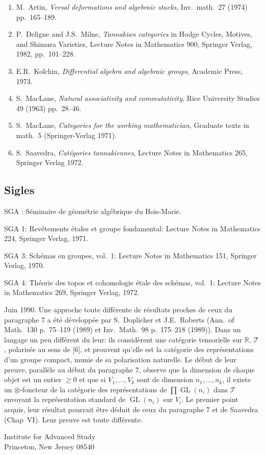 \documentclass[12pt,a4paper]{article}
\theoremstyle{plain}
\theoremstyle{definition}
\DeclareMathOperator{\GL}{GL}
\begin{document}
\begin{enumerate}
\item[{[1]}] M.~Artin, \textit{Versal deformations and algebraic stacks}, Inv.~math.~27 (1974) pp.~165--189.

\item[{[2]}] P.~Deligne and J.S.~Milne, \textit{Tannakian categories} in Hodge Cycles, Motives, and Shimura Varieties, Lecture Notes in Mathematics 900, Springer Verlag, 1982, pp.~101--228.

\item[{[3]}] E.R.~Kolchin, \textit{Differential algebra and algebraic groups}, Academic Press, 1973.

\item[{[4]}] S.~MacLane, \textit{Natural associativity and commutativity}, Rice University Studies 49 (1963) pp.~28--46.

\item[{[5]}] S.~MacLane, \textit{Categories for the working mathematician}, Graduate texts in math.~5 (Springer-Verlag 1971).

\item[{[6]}] S.~Saavedra, \textit{Catégories tannakiennes}, Lecture Notes in Mathematics 265, Springer Verlag 1972.
\end{enumerate}

\subsection*{Sigles}

SGA : Séminaire de géométrie algébrique du Bois-Marie.

SGA 1: Revêtements étales et groupe fondamental: Lecture Notes in Mathematics 224, Springer Verlag, 1971.

SGA 3: Schémas en groupes, vol.~1: Lecture Notes in Mathematics 151, Springer Verlag, 1970.

SGA 4: Théorie des topos et cohomologie étale des schémas, vol.~1: Lecture Notes in Mathematics 269, Springer Verlag, 1972.

\vspace{1cm}

Juin 1990. Une approche toute différente de résultats proches de ceux du paragraphe 7 a été développée par S.~Doplicher et J.E.~Roberts (Ann.\ of Math.\ 130 p.~75--119 (1989) et Inv.\ Math.\ 98 p.~175--218 (1989)). Dans un langage un peu différent du leur: ils considèrent une catégorie tensorielle sur $\mathbb{R}$, $\mathcal{T}$, polarisée au sens de [6], et prouvent qu'elle est la catégorie des représentations d'un groupe compact, munie de sa polarisation naturelle. Le début de leur preuve, parallèle au début du paragraphe 7, observe que la dimension de chaque objet est un entier $\geq 0$ et que si $V_1, \ldots, V_k$ sont de dimension $n_1, \ldots, n_k$, il existe un $\otimes$-foncteur de la catégorie des représentations de $\prod \GL(n_i)$ dans $\mathcal{T}$ envoyant la représentation standard de $\GL(n_i)$ sur $V_i$. Le premier point acquis, leur résultat pourrait être déduit de ceux du paragraphe 7 et de Saavedra (Chap~VI). Leur preuve est toute différente.

\vspace{1cm}

\begin{flushright}
Institute for Advanced Study\\
Princeton, New Jersey 08540
\end{flushright}
\end{document}
